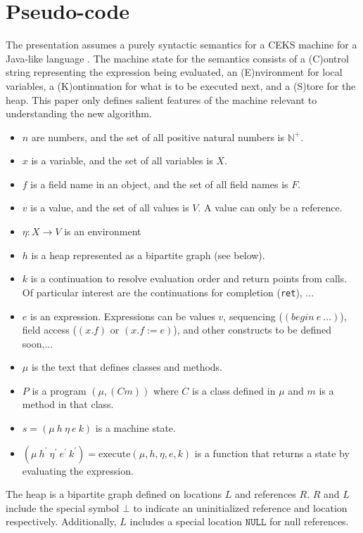 \section{Pseudo-code}


The presentation assumes a purely syntactic semantics for a CEKS
machine for a Java-like language \cite{saints-MS}. The machine state
for the semantics consists of a (C)ontrol string representing the
expression being evaluated, an (E)nvironment for local variables, a
(K)ontinuation for what is to be executed next, and a (S)tore for the
heap. This paper only defines salient features of the machine relevant to understanding the new algorithm.
\begin{itemize}
\item $n$ are numbers, and the set of all positive natural numbers is $\mathbb{N}^+$.
\item $x$ is a variable, and the set of all variables is $X$.
\item $f$ is a field name in an object, and the set of all field names is $F$.
\item $v$ is a value, and the set of all values is $V$. A value can only be a reference. 
\item $\eta : X \rightarrow V$ is an environment
\item $h$ is a heap represented as a bipartite graph (see below).
\item $k$ is a continuation to resolve evaluation order and return points from calls. Of particular interest are the continuations for completion (\texttt{ret}), ...
\item $e$ is an expression. Expressions can be values $v$, sequencing
  ($(begin\ e\ \ldots)$), field access ($(x.f)$ or $(x.f := e)$), and
  other constructs to be defined soon,...
\item $\mu$ is the text that defines classes and methods.
\item $P$ is a program $(\mu, (C m))$ where $C$ is a class defined in
  $\mu$ and $m$ is a method in that class.
\item $s = (\mu\ h\ \eta\ e\ k)$ is a machine state.
\item $(\mu\ h^\prime\ \eta^\prime\ e^\prime\ k^\prime) =
  \mathrm{execute}(\mu, h, \eta, e, k)$ is a function that returns a
  state by evaluating the expression.
\end{itemize}

The heap is a bipartite graph defined on locations $L$ and references
$R$. $R$ and $L$ include the special symbol $\bot$ to indicate an
uninitialized reference and location respectively. Additionally, $L$
includes a special location $\mathtt{NULL}$ for null references.

